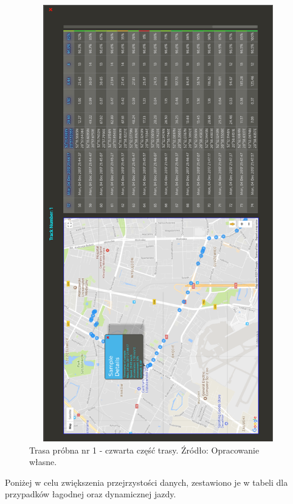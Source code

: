 \begin{figure}[H]
	\centering
	\includegraphics[height=19cm, width=13cm]{img/driving_analysis/test_track_part_4.png}
	\caption{Trasa próbna nr 1 - czwarta część trasy. Źródło: Opracowanie własne.}
	\label{fig:image_driving_analysis_alghoritm_track_1_part_4}
\end{figure}

Poniżej w celu zwiększenia przejrzystości danych, zestawiono je w tabeli dla przypadków łagodnej oraz dynamicznej jazdy.

